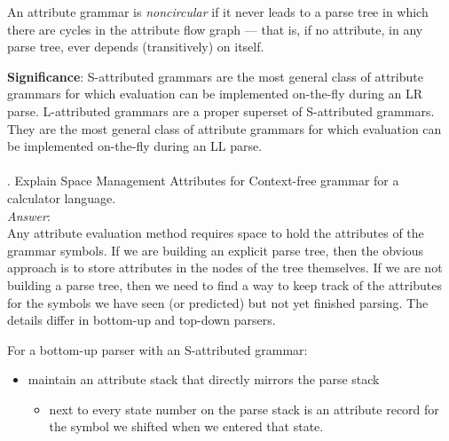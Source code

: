 \documentclass[a4paper,12pt]{article}
\begin{document}
An attribute grammar is \textit{noncircular} if it never leads to a parse tree in which there are cycles in the attribute
flow graph --- that is, if no attribute, in any parse tree, ever depends (transitively) on itself.

\textbf{Significance}:    S-attributed grammars are the most general class of attribute grammars for which evaluation can be implemented on-the-fly during an LR parse. L-attributed grammars are a proper superset of S-attributed grammars. They are the most general class of attribute grammars for which evaluation can be implemented on-the-fly during an LL parse.\\
\\
. Explain Space Management Attributes for Context-free grammar for a calculator language.\\
\emph{Answer}:\\
Any attribute evaluation method requires space to hold the attributes of the
grammar symbols. If we are building an explicit parse tree, then the obvious approach is to store attributes in the nodes of the tree themselves. If we are not building a parse tree, then we need to find a way to keep track of the attributes
for the symbols we have seen (or predicted) but not yet finished parsing. The details differ in bottom-up and top-down parsers.

For a bottom-up parser with an S-attributed grammar:
\begin{itemize}
\item maintain an attribute stack that directly mirrors the parse stack
\begin{itemize}
\item next to every state number on the parse stack is an attribute record for the symbol we shifted when we entered that state.
\end {itemize}
\end {itemize}
\end{document}
